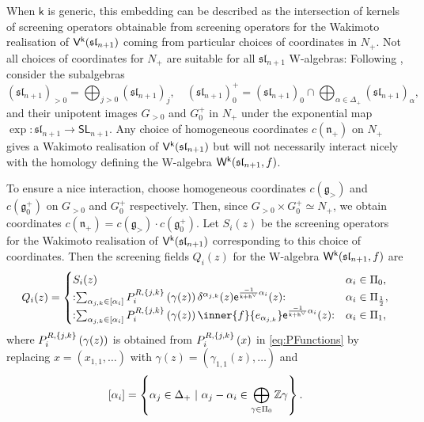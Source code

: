 \documentclass[10pt,a4paper]{amsart}
\numberwithin{equation}{section}
\renewcommand{\cong}{\simeq} %
\newcommand{\ee}{\mathsf{e}}   %
\newcommand{\kk}{\mathsf{k}}   %
\DeclarePairedDelimiter{\brac}{\lparen}{\rparen}   %
\DeclarePairedDelimiter{\sqbrac}{\lbrack}{\rbrack} %
\DeclarePairedDelimiter{\set}{\lbrace}{\rbrace}
\newcommand{\no}[1]{\mathopen{:} #1 \mathclose{:}} %
\newcommand{\fld}[1]{\mathbb{#1}}    %
\newcommand{\alg}[1]{\mathfrak{#1}}  %
\newcommand{\grp}[1]{\mathsf{#1}}    %
\newcommand{\VOA}[1]{\mathsf{#1}}    %
\newcommand{\ZZ}{\fld{Z}}
\newcommand{\SLG}[2]{\grp{#1}_{#2}}            %
\newcommand{\SLA}[2]{\alg{#1}_{#2}}                      %
\newcommand{\slnpone}{\SLA{sl}{n+1}}
\newcommand{\cox}{\mathsf{h}}                                        %
\newcommand{\dcox}{\coroot{\cox}}                                    %
\newcommand{\proots}{\Delta_+}                                       %
\newcommand{\sroots}{\Pi}                                            %
\newcommand{\sroot}[1]{\alpha_{#1}}                                  %
\newcommand{\coroot}[1]{#1^{\vee}}                                   %
\newcommand{\Wsymb}{\VOA{W}}
\newcommand{\uaffvoa}[2]{\VOA{V}^{#1}\brac{#2}}                   %
\newcommand{\uQHR}[3]{\Wsymb^{#1}\brac{#2,#3}}                    %
\theoremstyle{plain}
\begin{document}
When $\kk$ is generic, this embedding can be described as the intersection of kernels of screening operators obtainable from screening operators for the Wakimoto realisation of $\uaffvoa{\kk}{\slnpone}$ coming from particular choices of coordinates in $N_+$. Not all choices of coordinates for $N_+$ are suitable for all $\slnpone$ W-algebras: Following \cite[Sec.~4.1]{GenScreen20}, consider the subalgebras 
%
\begin{equation}
    (\slnpone)_{>0} = \bigoplus_{j>0} (\slnpone)_j, \quad (\slnpone)^+_0 = (\slnpone)_0 \cap \bigoplus_{\alpha \in \proots} (\slnpone)_\alpha,
\end{equation}
%
and their unipotent images $G_{>0}$ and $G^+_0$ in $N_+$ under the exponential map $\exp:\slnpone \rightarrow \SLG{SL}{n+1}$. Any choice of homogeneous coordinates $c(\mathfrak{n}_+)$ on $N_+$ gives a Wakimoto realisation of $\uaffvoa{\kk}{\slnpone}$ but will not necessarily interact nicely with the homology defining the W-algebra $\uQHR{\kk}{\slnpone}{f}$. 

To ensure a nice interaction, choose homogeneous coordinates $c(\mathfrak{g}_{>})$ and $c(\mathfrak{g}^+_{0})$ on $G_{>0}$ and $G^+_0$ respectively. Then, since $G_{>0} \times G^+_0 \cong N_+$, we obtain coordinates $c(\mathfrak{n}_+) = c(\mathfrak{g}_{>}) \cdot c(\mathfrak{g}^+_{0})$. Let $S_i(z)$ be the screening operators for the Wakimoto realisation of $\uaffvoa{\kk}{\slnpone}$ corresponding to this choice of coordinates. Then the screening fields $Q_i(z)$ for the W-algebra $\uQHR{\kk}{\slnpone}{f}$ are \cite[Thm.~4.8]{GenScreen20}
%
\begin{equation} \label{eq:WalgWakScreenings}
\begin{gathered}
    Q_i(z) = 
    \begin{cases}
        S_i(z) & \sroot{i} \in \sroots_{0}, \\
        \no{\sum_{\alpha_{j,k} \in \sqbrac{\sroot{i}}} P^{R,\set{j,k}}_{i} \left(\gamma(z)\right) \delta^{\alpha_{j,k}}(z) \ee^{\frac{-1}{\kk+\dcox} \alpha_{i}}(z)} & \sroot{i} \in \sroots_{\frac{1}{2}}, \\
        \no{\sum_{\alpha_{j,k} \in \sqbrac{\sroot{i}}} P^{R,\set{j,k}}_{i} \left(\gamma(z)\right)  \inner{f}{e_{\alpha_{j,k}}} \ee^{\frac{-1}{\kk+\dcox} \alpha_{i}}(z)} & \sroot{i} \in \sroots_{1},
    \end{cases}
\end{gathered}   
\end{equation}
%
where $P^{R,\set{j,k}}_{i} \left(\gamma(z)\right)$ is obtained from $P^{R,\set{j,k}}_{i} \left(x\right)$ in \eqref{eq:PFunctions} by replacing $x=(x_{1,1},\dots)$ with $\gamma(z)=(\gamma_{1,1}(z),\dots)$ and
%
\begin{equation}
    \sqbrac{\sroot{i}} = \left\{ \alpha_j \in \proots \ \vert \ \alpha_j-\sroot{i} \in \bigoplus_{\gamma \in \sroots_0} \ZZ \gamma \right\}.
\end{equation}
\end{document}
